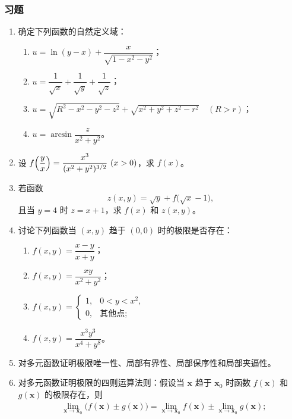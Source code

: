 \documentclass[11pt]{ctexart}
\theoremstyle{plain}
\theoremstyle{definition}
\theoremstyle{remark}
\begin{document}
\subsubsection{习题}

\begin{enumerate}
  \item 确定下列函数的自然定义域：
        \begin{enumerate}
          \item[(1)] \(u=\ln(y-x)+\dfrac{x}{\sqrt{1-x^2-y^2}}\)；
          \item[(2)] \(u=\dfrac{1}{\sqrt{x}}+\dfrac{1}{\sqrt{y}}+\dfrac{1}{\sqrt{z}}\)；
          \item[(3)] \(u=\sqrt{R^2-x^2-y^2-z^2}+\sqrt{x^2+y^2+z^2-r^2}\quad (R>r)\)；
          \item[(4)] \(u=\arcsin\dfrac{z}{x^2+y^2}\)。
        \end{enumerate}
  \item 设 \(f\Bigl(\dfrac{y}{x}\Bigr)=\dfrac{x^3}{(x^2+y^2)^{3/2}}\ (x>0)\)，求 \(f(x)\)。
  \item 若函数
        \[
          z(x,y)=\sqrt{y}+f\bigl(\sqrt{x}-1\bigr),
        \]
        且当 \(y=4\) 时 \(z=x+1\)，求 \(f(x)\) 和 \(z(x,y)\)。
  \item 讨论下列函数当 \((x,y)\) 趋于 \((0,0)\) 时的极限是否存在：
        \begin{enumerate}
          \item[(1)] \(f(x,y)=\dfrac{x-y}{x+y}\)；
          \item[(2)] \(f(x,y)=\dfrac{xy}{x^2+y^2}\)；
          \item[(3)] \(f(x,y)=\begin{cases}1,&0<y<x^2,\\ 0,&\text{其他点};\end{cases}\)
          \item[(4)] \(f(x,y)=\dfrac{x^3y^3}{x^4+y^8}\)。
        \end{enumerate}
  \item 对多元函数证明极限唯一性、局部有界性、局部保序性和局部夹逼性。
  \item 对多元函数证明极限的四则运算法则：假设当 \(\boldsymbol{x}\) 趋于
        \(\boldsymbol{x}_0\) 时函数 \(f(\boldsymbol{x})\) 和 \(g(\boldsymbol{x})\) 的极限存在，则
        \begin{align*}
          &\lim_{\boldsymbol{x}\to\boldsymbol{x}_0}\bigl(f(\boldsymbol{x})\pm g(\boldsymbol{x})\bigr)
           =\lim_{\boldsymbol{x}\to\boldsymbol{x}_0}f(\boldsymbol{x})
           \pm\lim_{\boldsymbol{x}\to\boldsymbol{x}_0}g(\boldsymbol{x});\\

\end{align*}
\end{enumerate}
\end{document}
